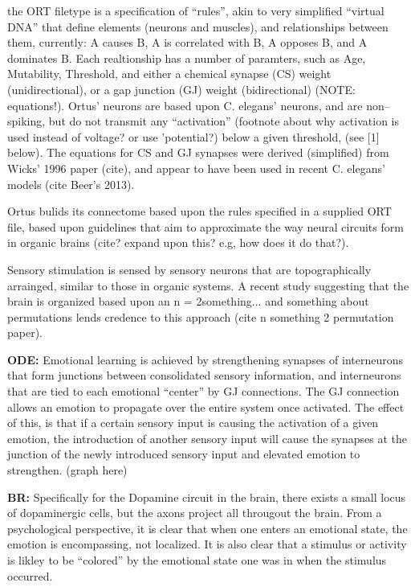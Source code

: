 \documentclass[letterpaper]{article}
\begin{document}
the ORT filetype is a specification of ``rules'', akin to very simplified ``virtual DNA'' that define elements (neurons and muscles), and relationships between them, currently: A causes B, A is correlated with B, A opposes B, and A dominates B. Each realtionship has a number of paramters, such as Age, Mutability, Threshold, and either a chemical synapse (CS) weight (unidirectional), or a gap junction (GJ) weight (bidirectional) (NOTE: equations!). Ortus' neurons are based upon C. elegans' neurons, and are non--spiking, but do not transmit any ``activation'' (footnote about why activation is used instead of voltage? or use 'potential?) below a given threshold, (see [1] below). The equations for CS and GJ synapses were derived (simplified) from Wicks' 1996 paper (cite), and appear to have been used in recent C. elegans' models (cite Beer's 2013).


Ortus bulids its connectome based upon the rules specified in a supplied ORT file, based upon guidelines that aim to approximate the way neural circuits form in organic brains (cite? expand upon this? e.g, how does it do that?).


Sensory stimulation is sensed by sensory neurons that are topographically arrainged, similar to those in organic systems. A recent study suggesting that the brain is organized based upon an n = 2something... and something about permutations lends credence to this approach (cite n something 2 permutation paper).


\textbf{ODE:} Emotional learning is achieved by strengthening synapses of interneurons that form junctions between consolidated sensory information, and interneurons that are tied to each emotional ``center'' by GJ connections. The GJ connection allows an emotion to propagate over the entire system once activated. The effect of this, is that if a certain sensory input is causing the activation of a given emotion, the introduction of another sensory input will cause the synapses at the junction of the newly introduced sensory input and elevated emotion to strengthen. (graph here)

\textbf{BR:} Specifically for the Dopamine circuit in the brain, there exists a small locus of dopaminergic cells, but the axons project all througout the brain. From a psychological perspective, it is clear that when one enters an emotional state, the emotion is encompassing, not localized. It is also clear that a stimulus or activity is likley to be ``colored'' by the emotional state one was in when the stimulus occurred.
\end{document}
